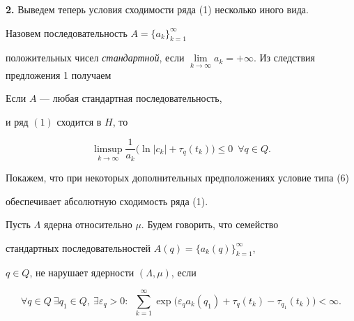 {\bf 2.} Выведем теперь условия сходимости ряда (1) несколько иного вида.


Назовем последовательность $A=\bigl\{a_k\bigr\}_{k=1}^{\infty}$


положительных чисел {\it стандартной}, если $\lim\limits_{k\to\infty}a_k=


+\infty$. Из следствия предложения 1 получаем





\begin{prop}


Если $A$ --- любая стандартная последовательность,


и ряд $(1)$ сходится в $H$, то


\begin{equation}


 \limsup\limits_{k\to\infty}\frac{1}{a_k}


\big(\ln|c_k|+\tau_q(t_k)\big)\leqslant 0 \ \; \forall q\in Q.


\end{equation}


\end{prop}





Покажем, что при некоторых дополнительных предположениях условие типа (6)


обеспечивает абсолютную сходимость ряда (1).


Пусть $\Lambda$ ядерна относительно $\mu$. Будем говорить, что семейство


стандартных последовательностей $A(q)=\big\{a_k(q)\big\}_{k=1}^{\infty}$,


$q\in Q$, не нарушает ядерности $(\Lambda,\mu)$, если


\begin{equation}


\forall q\in Q\ \exists q_1\in Q,\ \exists \varepsilon_q>0:\ \;


\sum\limits_{k=1}^{\infty}\exp\big(\varepsilon_qa_k(q_1)+\tau_q(t_k)-


\tau_{q_1}(t_k)\big)<\infty.


\end{equation}





